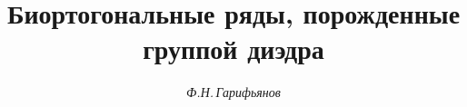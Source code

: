 




%


\newcommand{\sgn}{\operatorname{sgn}}


\newcommand{\im}{\operatorname{Im}}


\newcommand{\re}{\operatorname{Re}}


\newcommand{\tts}[1]{}







\setcounter{page}{11}















\author{\it Ф.Н.\,Гарифьянов }




\title{Биортогональные ряды, порожденные группой диэдра}





\date{}




\pagestyle{plain} %







\maketitle


\label{begin}





